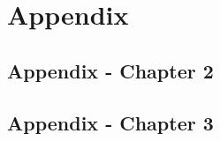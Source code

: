 \documentclass[a4paper,12pt,oneside]{memoir}
\begin{document}
\appendix
{}
\chapter{Appendix}

\begingroup
  \section{Appendix - Chapter 2}
  \setcounter{figure}{0} \renewcommand{\thefigure}{A.2.\arabic{figure}} 
  \setcounter{table}{0} \renewcommand{\thetable}{A.2.\arabic{table}}
  
  \clearpage
  \section{Appendix - Chapter 3}
  \setcounter{figure}{0} \renewcommand{\thefigure}{A.3.\arabic{figure}} 
  \setcounter{table}{0} \renewcommand{\thetable}{A.3.\arabic{table}}
  
  \clearpage
\endgroup

\end{document}
